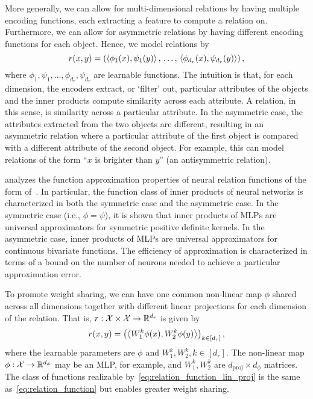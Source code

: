 More generally, we can allow for multi-dimensional relations by having multiple encoding functions, each extracting a feature to compute a relation on. Furthermore, we can allow for asymmetric relations by having different encoding functions for each object. Hence, we model relations by
\begin{equation}\label{eq:relation_function}
    r(x, y) = \left(
        \left \langle \phi_1(x), \psi_1(y) \right\rangle,\, \ldots,\, \left \langle \phi_{d_r}(x), \psi_{d_r}(y) \right\rangle\right),
\end{equation}
where $\phi_1, \psi_1, \ldots, \phi_{d_r}, \psi_{d_r}$ are learnable functions. 
The intuition is that, for each dimension, the encoders extract, or `filter' out, particular attributes of the objects and the inner products compute similarity across each attribute.
A relation, in this sense, is similarity across a particular attribute. 
In the asymmetric case, the attributes extracted from the two objects are different, resulting in an asymmetric relation where a particular attribute of the first object is compared with a different attribute of the second object. For example, this can model relations of the form ``$x$ is brighter than $y$'' (an antisymmetric relation).

\citet{altabaaApproximationRelationFunctions2024} analyzes the function approximation properties of neural relation functions of the form of~. In particular, the function class of inner products of neural networks is characterized in both the symmetric case and the asymmetric case. In the symmetric case (i.e., $\phi = \psi$), it is shown that inner products of MLPs are universal approximators for symmetric positive definite kernels. In the asymmetric case, inner products of MLPs are universal approximators for continuous bivariate functions. The efficiency of approximation is characterized in terms of a bound on the number of neurons needed to achieve a particular approximation error.

To promote weight sharing, we can have one common non-linear map $\phi$ shared across all dimensions together with different linear projections for each dimension of the relation. That is, $r: {\mathcal{X}} \times {\mathcal{X}} \to \mathbb{R}^{d_r}$ is given by
\begin{equation}\label{eq:relation_function_lin_proj}
    r(x, y) = \left(\left \langle W_1^{k}\phi(x), W_2^{k}\phi(y) \right\rangle\right)_{k \in [d_r]},
\end{equation}
where the learnable parameters are $\phi$ and $W_1^{k}, W_2^{k}, k \in [d_r]$. The non-linear map $\phi: {\mathcal{X}} \to \mathbb{R}^{d_\phi}$ may be an MLP, for example, and $W_1^{k}, W_2^{k}$ are $d_{\mathrm{proj}} \times d_\phi$ matrices. The class of functions realizable by~\cref{eq:relation_function_lin_proj} is the same as~\cref{eq:relation_function} but enables greater weight sharing.

